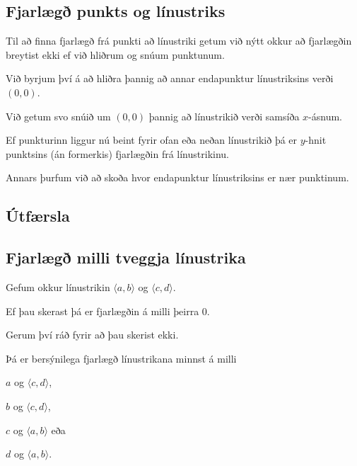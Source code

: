 \subsection{Fjarlægð punkts og línustriks}
{
    {
        \item<1-> Til að finna fjarlægð frá punkti að línustriki getum við nýtt okkur að fjarlægðin breytist ekki ef við hliðrum og snúum punktunum.
        \item<2-> Við byrjum því á að hliðra þannig að annar endapunktur línustriksins verði $(0, 0)$.
        \item<3-> Við getum svo snúið um $(0, 0)$ þannig að línustrikið verði samsíða $x$-ásnum.
        \item<4-> Ef punkturinn liggur nú beint fyrir ofan eða neðan línustrikið þá er $y$-hnit punktsins (án formerkis) fjarlægðin frá línustrikinu.
        \item<5-> Annars þurfum við að skoða hvor endapunktur línustriksins er nær punktinum.
    }
}

\subsection{Útfærsla}
{
}

\subsection{Fjarlægð milli tveggja línustrika}
{
    {
        \item<1-> Gefum okkur línustrikin $\langle a, b \rangle$ og $\langle c, d \rangle$.
        \item<2-> Ef þau skerast þá er fjarlægðin á milli þeirra $0$.
        \item<3-> Gerum því ráð fyrir að þau skerist ekki.
        \item<4-> Þá er bersýnilega fjarlægð línustrikana minnst á milli 
        {
            \item<5-> $a$ og $\langle c, d \rangle$, 
            \item<6-> $b$ og $\langle c, d \rangle$, 
            \item<7-> $c$ og $\langle a, b \rangle$ eða 
            \item<8-> $d$ og $\langle a, b \rangle$.
        }
    }
}

